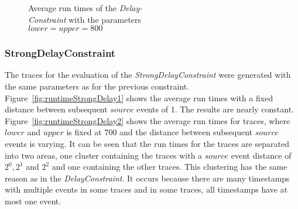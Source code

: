 \begin{figure}
\begin{minipage}{0.45\textwidth}
			\centering
			\caption{Average run times of the \textit{Delay-\\Constraint} with the parameters\\ $lower = upper = 800$}
			\label{fig:runtimeDelay2}
		\end{minipage}
		\centering
	\end{figure}


\subsubsection{StrongDelayConstraint}
	The traces for the evaluation of the \textit{StrongDelayConstraint} were generated with the same parameters as for the previous constraint. Figure~\ref{fig:runtimeStrongDelay1} shows the average run times with a fixed distance between subsequent $source$ events of 1. The results are nearly constant. Figure~\ref{fig:runtimeStrongDelay2} shows the average run times for traces, where $lower$ and $upper$ is fixed at 700 and the distance between subsequent $source$ events is varying. It can be seen that the run times for the traces are separated into two areas, one cluster containing the traces with a $source$ event distance of $2^0, 2^1$ and $2^2$ and one containing the other traces. This clustering has the same reason as in the \textit{DelayConstraint}. It occurs because there are many timestamps with multiple events in some traces and in some traces, all timestamps have at most one event.
	
